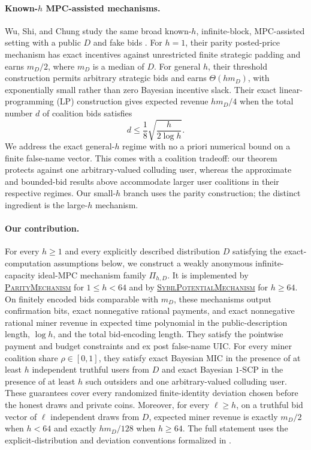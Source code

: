 \documentclass[11pt]{article}
\begin{document}
\paragraph{Known-$h$ MPC-assisted mechanisms.}
Wu, Shi, and Chung study the same broad known-$h$, infinite-block,
MPC-assisted setting with a public $D$ and fake bids
\cite{wu_et_al:LIPIcs.ITCS.2024.98}.  For $h=1$, their parity posted-price
mechanism has exact incentives against unrestricted finite strategic padding
and earns $m_D/2$, where $m_D$ is a median of $D$.  For general $h$, their
threshold construction permits arbitrary strategic bids and earns
$\Theta(hm_D)$, with exponentially small rather than zero Bayesian incentive
slack.  Their exact linear-programming (LP) construction gives expected
revenue $hm_D/4$ when the total number $d$ of coalition bids satisfies
\[
  d\le \frac18\sqrt{\frac{h}{2\log h}}.
\]
We address the exact general-$h$ regime with no a priori numerical bound on a
finite false-name vector.  This comes with a coalition tradeoff: our theorem
protects against one arbitrary-valued colluding user, whereas the approximate
and bounded-bid results above accommodate larger user coalitions in their
respective regimes.  Our small-$h$ branch uses the parity construction; the
distinct ingredient is the large-$h$ mechanism.

\paragraph{Our contribution.}
For every $h\ge1$ and every explicitly described distribution $D$ satisfying
the exact-computation assumptions below, we construct a weakly anonymous
infinite-capacity ideal-MPC mechanism family $\Pi_{h,D}$.  It is implemented by
\hyperref[alg:parity-mechanism]{\textsc{ParityMechanism}} for $1\le h<64$
and by
\hyperref[alg:sybil-potential-mechanism]{\textsc{SybilPotentialMechanism}}
for $h\ge64$.  On finitely encoded bids comparable with $m_D$, these
mechanisms output confirmation bits, exact nonnegative rational payments, and
exact nonnegative rational miner revenue in expected time polynomial in the
public-description length, $\log h$, and the total bid-encoding length.  They
satisfy the pointwise payment and budget constraints and ex post false-name
UIC.  For every miner coalition share $\rho\in[0,1]$, they satisfy exact
Bayesian MIC in the presence of at least $h$ independent truthful users from
$D$ and exact Bayesian $1$-SCP in the presence of at least $h$ such outsiders
and one arbitrary-valued colluding user.  These guarantees cover every
randomized finite-identity deviation chosen before the honest draws and
private coins.  Moreover, for every $\ell\ge h$, on a truthful bid vector of
$\ell$ independent draws from $D$, expected miner revenue is exactly $m_D/2$
when $h<64$ and exactly $hm_D/128$ when $h\ge64$.  The full statement uses the
explicit-distribution and deviation conventions formalized in
.
\end{document}
